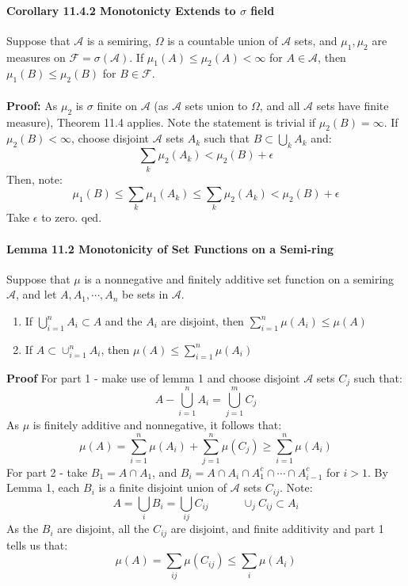 \documentclass[12pt,a4paper]{article}
\newcommand{\1}[1]{\mathbbm{1}\left\{ #1 \right\}}
\newcommand{\acal}{\mathcal{A}}
\newcommand{\fcal}{\mathcal{F}}
\begin{document}
\paragraph{Corollary 11.4.2 Monotonicty Extends to $\sigma$ field} Suppose that $\acal$ is a semiring, $\Omega$ is a countable union of $\acal$ sets, and $\mu_1, \mu_2$ are measures on $\fcal = \sigma(\acal)$. If $\mu_1(A) \leq \mu_2(A) < \infty$ for $A \in \acal$, then $\mu_1(B) \leq \mu_2(B)$ for $B \in \fcal$.
\\\\
\textbf{Proof:} As $\mu_2$ is $\sigma$ finite on $\acal$ (as $\acal$ sets union to $\Omega$, and all $\acal$ sets have finite measure), Theorem 11.4 applies. Note the statement is trivial if $\mu_2(B) = \infty$. If $\mu_2(B) < \infty$, choose disjoint $\acal$ sets $A_k$ such that $B \subset \bigcup_k A_k$ and:
$$
	\sum_k \mu_2(A_k) < \mu_2(B) + \epsilon
$$
Then, note:
$$
	\mu_1(B) \leq \sum_k \mu_1(A_k) \leq \sum_k \mu_2(A_k) < \mu_2(B) + \epsilon
$$
Take $\epsilon$ to zero. qed.

\paragraph{Lemma 11.2 Monotonicity of Set Functions on a Semi-ring} Suppose that $\mu$ is a nonnegative and finitely additive set function on a semiring $\acal$, and let $A, A_1, \cdots, A_n$ be sets in $\acal$. 
\begin{enumerate}
	\item If $\bigcup_{i=1}^n A_i \subset A$ and the $A_i$ are disjoint, then $\sum_{i=1}^n \mu(A_i) \leq \mu(A)$
	\item If $A \subset \cup_{i=1}^n A_i$, then $\mu(A) \leq \sum_{i=1}^n \mu(A_i)$
\end{enumerate}
\textbf{Proof} For part 1 - make use of lemma 1 and choose disjoint $\acal$ sets $C_j$ such that:
$$
	A - \bigcup_{i=1}^n A_i = \bigcup_{j=1}^m C_j
$$
As $\mu$ is finitely additive and nonnegative, it follows that:
$$
	\mu(A) = \sum_{i=1}^n \mu(A_i) + \sum_{j=1}^n \mu(C_j) \geq \sum_{i=1}^n \mu(A_i)
$$
For part 2 - take $B_1 = A \cap A_1$, and $B_i = A \cap A_i \cap A_1^c \cap \cdots \cap A_{i-1}^c$ for $i > 1$. By Lemma 1, each $B_i$ is a finite disjoint union of $\acal$ sets $C_{ij}$. Note:
$$
	A = \bigcup_i B_i = \bigcup_{ij} C_{ij} \quad\quad\quad
	\cup_j C_{ij} \subset A_i
$$
As the $B_i$ are disjoint, all the $C_{ij}$ are disjoint, and finite additivity and part 1 tells us that:
$$
	\mu(A) = \sum_{ij} \mu(C_{ij}) \leq \sum_i \mu(A_i)
$$
\end{document}

